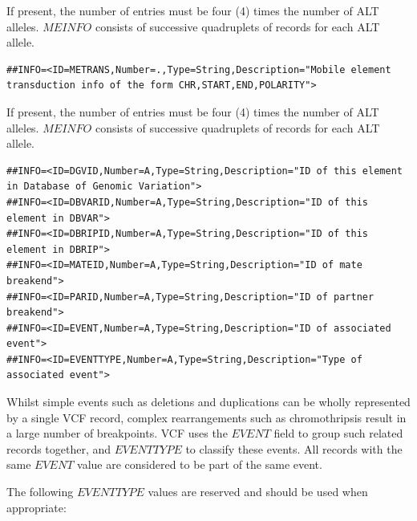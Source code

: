 \documentclass[8pt]{article}
\begin{document}
If present, the number of entries must be four (4) times the number of ALT alleles.
$MEINFO$ consists of successive quadruplets of records for each ALT allele.

\footnotesize
\begin{verbatim}
##INFO=<ID=METRANS,Number=.,Type=String,Description="Mobile element transduction info of the form CHR,START,END,POLARITY">
\end{verbatim}
\normalsize

If present, the number of entries must be four (4) times the number of ALT alleles.
$MEINFO$ consists of successive quadruplets of records for each ALT allele.

\footnotesize
\begin{verbatim}
##INFO=<ID=DGVID,Number=A,Type=String,Description="ID of this element in Database of Genomic Variation">
##INFO=<ID=DBVARID,Number=A,Type=String,Description="ID of this element in DBVAR">
##INFO=<ID=DBRIPID,Number=A,Type=String,Description="ID of this element in DBRIP">
##INFO=<ID=MATEID,Number=A,Type=String,Description="ID of mate breakend">
##INFO=<ID=PARID,Number=A,Type=String,Description="ID of partner breakend">
##INFO=<ID=EVENT,Number=A,Type=String,Description="ID of associated event">
##INFO=<ID=EVENTTYPE,Number=A,Type=String,Description="Type of associated event">
\end{verbatim}
\normalsize

Whilst simple events such as deletions and duplications can be wholly represented by a single VCF record, complex rearrangements such as chromothripsis result in a large number of breakpoints.
VCF uses the $EVENT$ field to group such related records together, and $EVENTTYPE$ to classify these events.
All records with the same $EVENT$ value are considered to be part of the same event.

The following $EVENTTYPE$ values are reserved and should be used when appropriate:
\end{document}
